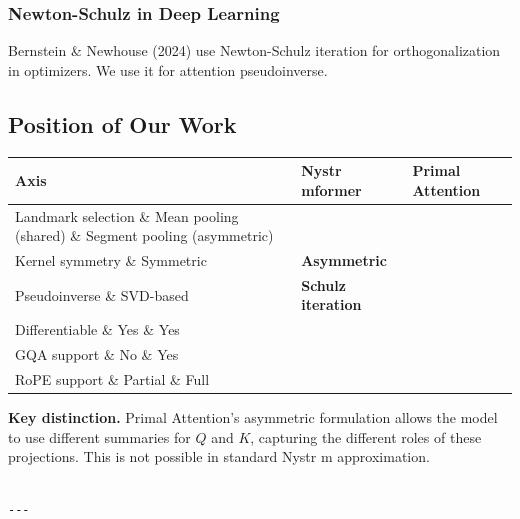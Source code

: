 \subsubsection{Newton-Schulz in Deep Learning}

Bernstein \& Newhouse (2024) use Newton-Schulz iteration for orthogonalization 
in optimizers. We use it for attention pseudoinverse.

\subsection{Position of Our Work}

\begin{table}[H]
\centering
\small
\begin{tabular}{lll}
\toprule
\textbf{Axis} & \textbf{Nystr mformer} & \textbf{Primal Attention} \\
\midrule
Landmark selection \& Mean pooling (shared) \& Segment pooling (asymmetric) \\
Kernel symmetry \& Symmetric & \textbf{Asymmetric} \\
Pseudoinverse \& SVD-based & \textbf{Schulz iteration} \\
Differentiable \& Yes \& Yes \\
GQA support \& No \& Yes \\
RoPE support \& Partial \& Full \\
\bottomrule
\end{tabular}
\end{table}

\textbf{Key distinction.} Primal Attention's asymmetric formulation allows the 
model to use different summaries for $Q$ and $K$, capturing the different 
roles of these projections. This is not possible in standard Nystr m 
approximation.
\begin{lstlisting}

---
\end{lstlisting}